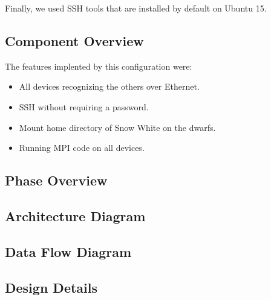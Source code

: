 Finally, we used SSH tools that are installed by default on Ubuntu 15.


\subsection{Component  Overview}
The features implented by this configuration were:

\begin{itemize}
	\item All devices recognizing the others over Ethernet.
	\item SSH without requiring a password.
	\item Mount home directory of Snow White on the dwarfs.
	\item Running MPI code on all devices.
\end{itemize}


\subsection{Phase Overview}

\subsection{ Architecture  Diagram}


\subsection{Data Flow Diagram}


\subsection{Design Details}

